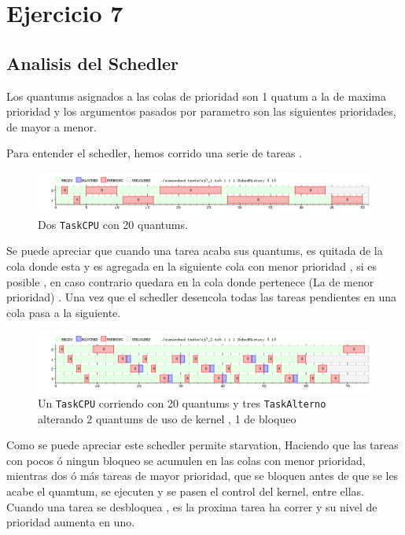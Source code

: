 \newpage
\section{Ejercicio 7}
	\subsection{Analisis del Schedler}

	Los quantums asignados a las colas de prioridad son 1 quatum a la de maxima prioridad y los argumentos pasados por parametro son las siguientes prioridades, de mayor a menor.

	Para entender el schedler, hemos corrido  una serie de tareas .

	\begin{figure}[ht]
		\begin{center}
			\includegraphics[width=1\columnwidth]{imagenes/ej7_1.png}
			\caption{Dos \texttt{TaskCPU} con 20 quantums.}
		\end{center}
	\end{figure}

	Se puede apreciar que cuando una  tarea acaba sus quantums, es quitada de la cola donde esta y es  agregada en la siguiente cola con menor prioridad , si es posible , en caso contrario quedara en la cola donde pertenece (La de menor prioridad) . Una vez que el schedler desencola todas las tareas pendientes en una cola pasa a la siguiente.


	\begin{figure}[ht]
		\begin{center}
			\includegraphics[width=1\columnwidth]{imagenes/ej7_2.png}
			\caption{Un \texttt{TaskCPU} corriendo con 20 quantums y tres \texttt{TaskAlterno} alterando 2 quantums de uso de kernel , 1 de bloqueo}
		\end{center}
	\end{figure}

	Como se puede apreciar este schedler permite starvation, Haciendo que las tareas con pocos ó ningun bloqueo se acumulen en las colas con menor prioridad, mientras dos ó más tareas de mayor prioridad, que se bloquen antes de que se les acabe el quamtum, se ejecuten y se pasen el control del kernel, entre ellas.
	Cuando una tarea se desbloquea , es la proxima tarea ha correr y su nivel de prioridad aumenta en uno.

